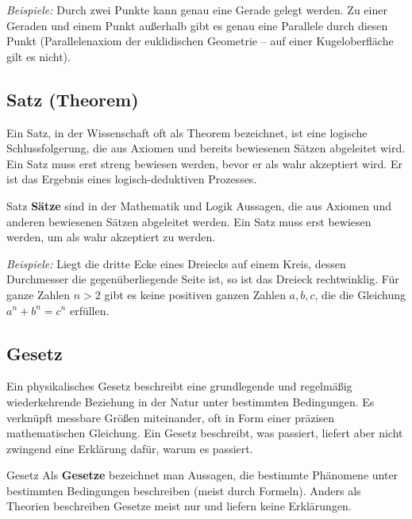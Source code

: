 \textit{Beispiele:} \newline
Durch zwei Punkte kann genau eine Gerade gelegt werden.\newline
Zu einer Geraden und einem Punkt außerhalb gibt es genau eine Parallele durch diesen Punkt (Parallelenaxiom der euklidischen Geometrie -- auf einer Kugeloberfläche gilt es \zB nicht).


\subsection{Satz (Theorem)}\label{subsec: Theorem}
Ein Satz, in der Wissenschaft oft als Theorem bezeichnet, ist eine logische Schlussfolgerung, die aus Axiomen und bereits bewiesenen Sätzen abgeleitet wird. Ein Satz muss erst streng bewiesen werden, bevor er als wahr akzeptiert wird. Er ist das Ergebnis eines logisch-deduktiven Prozesses.
\begin{rememberbox}[]{Satz}
    \textbf{Sätze} sind in der Mathematik und Logik Aussagen, die aus Axiomen und anderen bewiesenen Sätzen abgeleitet werden. Ein Satz muss erst bewiesen werden, um als wahr akzeptiert zu werden.
\end{rememberbox}

\textit{Beispiele:}  Liegt die dritte Ecke eines Dreiecks auf einem Kreis, dessen Durchmesser die gegenüberliegende Seite ist, so ist das Dreieck rechtwinklig.  Für ganze Zahlen $n > 2$ gibt es keine positiven ganzen Zahlen $a, b, c$, die die Gleichung $a^n + b^n = c^n$ erfüllen.


\subsection{Gesetz}\label{subsec: Gesetz}
Ein physikalisches Gesetz beschreibt eine grundlegende und regelmäßig wiederkehrende Beziehung in der Natur unter bestimmten Bedingungen. Es verknüpft messbare Größen miteinander, oft in Form einer präzisen mathematischen Gleichung. Ein Gesetz beschreibt, was passiert, liefert aber nicht zwingend eine Erklärung dafür, warum es passiert.
\begin{rememberbox}[]{Gesetz}
    Als \textbf{Gesetze} bezeichnet man Aussagen, die bestimmte Phänomene unter bestimmten Bedingungen beschreiben (meist durch Formeln). Anders als Theorien beschreiben Gesetze meist nur und liefern keine Erklärungen.
\end{rememberbox}

